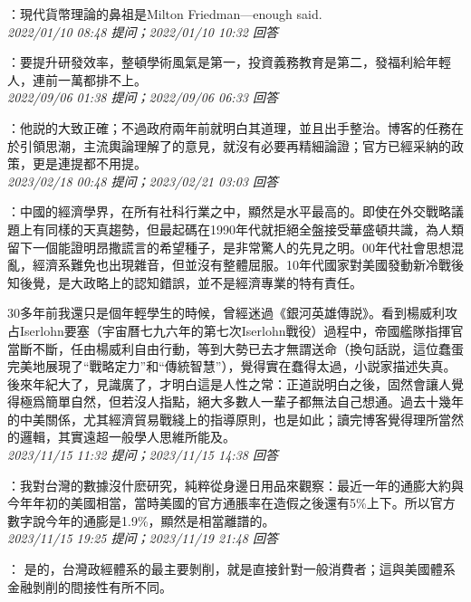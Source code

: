 \documentclass[twocolumn]{ctexart}
\begin{document}
：現代貨幣理論的鼻祖是Milton Friedman---enough said.
\\

\textit{\hfill\noindent\small 2022/01/10 08:48 提问；2022/01/10 10:32 回答}

：要提升研發效率，整頓學術風氣是第一，投資義務教育是第二，發福利給年輕人，連前一萬都排不上。
\\

\textit{\hfill\noindent\small 2022/09/06 01:38 提问；2022/09/06 06:33 回答}

：他説的大致正確；不過政府兩年前就明白其道理，並且出手整治。博客的任務在於引領思潮，主流輿論理解了的意見，就沒有必要再精細論證；官方已經采納的政策，更是連提都不用提。
\\

\textit{\hfill\noindent\small 2023/02/18 00:48 提问；2023/02/21 03:03 回答}

：中國的經濟學界，在所有社科行業之中，顯然是水平最高的。即使在外交戰略議題上有同樣的天真趨勢，但最起碼在1990年代就拒絕全盤接受華盛頓共識，為人類留下一個能證明昂撒謊言的希望種子，是非常驚人的先見之明。00年代社會思想混亂，經濟系難免也出現雜音，但並沒有整體屈服。10年代國家對美國發動新冷戰後知後覺，是大政略上的認知錯誤，並不是經濟專業的特有責任。

30多年前我還只是個年輕學生的時候，曾經迷過《銀河英雄傳説》。看到楊威利攻占Iserlohn要塞（宇宙曆七九六年的第七次Iserlohn戰役）過程中，帝國艦隊指揮官當斷不斷，任由楊威利自由行動，等到大勢已去才無謂送命（換句話説，這位蠢蛋完美地展現了“戰略定力”和“傳統智慧”），覺得實在蠢得太過，小説家描述失真。後來年紀大了，見識廣了，才明白這是人性之常：正道説明白之後，固然會讓人覺得極爲簡單自然，但若沒人指點，絕大多數人一輩子都無法自己想通。過去十幾年的中美關係，尤其經濟貿易戰綫上的指導原則，也是如此；讀完博客覺得理所當然的邏輯，其實遠超一般學人思維所能及。
\\

\textit{\hfill\noindent\small 2023/11/15 11:32 提问；2023/11/15 14:38 回答}

：我對台灣的數據沒什麽研究，純粹從身邊日用品來觀察：最近一年的通膨大約與今年年初的美國相當，當時美國的官方通脹率在造假之後還有5\%上下。所以官方數字說今年的通膨是1.9\%，顯然是相當離譜的。
\\

\textit{\hfill\noindent\small 2023/11/15 19:25 提问；2023/11/19 21:48 回答}

：
是的，台灣政經體系的最主要剝削，就是直接針對一般消費者；這與美國體系金融剝削的間接性有所不同。
\\
\end{document}
